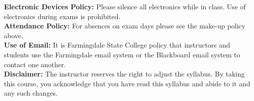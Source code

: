 \documentclass[11pt]{article}
\begin{document}
{\bf Electronic Devices Policy: }Please silence all electronics while in class. Use of electronics during exams is prohibited.\\

{\bf Attendance Policy: } For absences on exam days please see the make-up policy above. \\

{\bf Use of Email: }It is Farmingdale State College policy that instructors and students use the Farmingdale email system or the Blackboard email system to contact one another. \\

{\bf Disclaimer:} The instructor reserves the right to adjust the syllabus. By taking this course, you acknowledge that you have read this syllabus and abide
to it and any such changes.
% 
\end{document}
